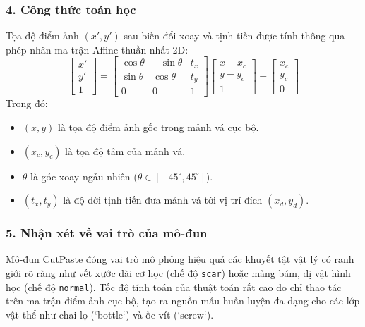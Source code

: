 \subsubsection*{4. Công thức toán học}
Tọa độ điểm ảnh $(x', y')$ sau biến đổi xoay và tịnh tiến được tính thông qua phép nhân ma trận Affine thuần nhất 2D:
\begin{equation}
    \begin{bmatrix} x' \\ y' \\ 1 \end{bmatrix} = 
    \begin{bmatrix} 
        \cos\theta & -\sin\theta & t_x \\ 
        \sin\theta & \cos\theta & t_y \\ 
        0 & 0 & 1 
    \end{bmatrix} 
    \begin{bmatrix} x - x_c \\ y - y_c \\ 1 \end{bmatrix} + 
    \begin{bmatrix} x_c \\ y_c \\ 0 \end{bmatrix}
\end{equation}
Trong đó:
\begin{itemize}
    \item $(x, y)$ là tọa độ điểm ảnh gốc trong mảnh vá cục bộ.
    \item $(x_c, y_c)$ là tọa độ tâm của mảnh vá.
    \item $\theta$ là góc xoay ngẫu nhiên ($\theta \in [-45^\circ, 45^\circ]$).
    \item $(t_x, t_y)$ là độ dời tịnh tiến đưa mảnh vá tới vị trí đích $(x_d, y_d)$.
\end{itemize}

\subsubsection*{5. Nhận xét về vai trò của mô-đun}
Mô-đun CutPaste đóng vai trò mô phỏng hiệu quả các khuyết tật vật lý có ranh giới rõ ràng như vết xước dài cơ học (chế độ \texttt{scar}) hoặc mảng bám, dị vật hình học (chế độ \texttt{normal}). Tốc độ tính toán của thuật toán rất cao do chỉ thao tác trên ma trận điểm ảnh cục bộ, tạo ra nguồn mẫu huấn luyện đa dạng cho các lớp vật thể như chai lọ (`bottle`) và ốc vít (`screw`).

